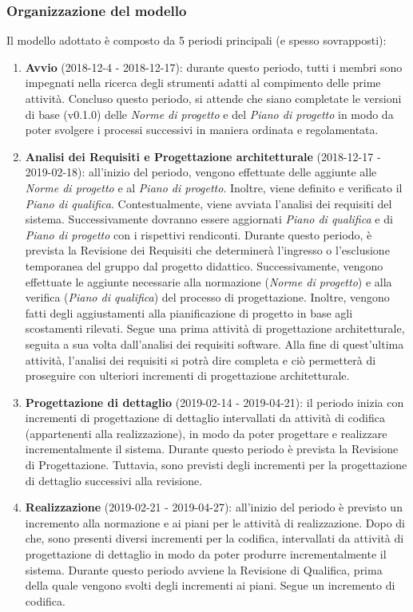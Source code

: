\subsubsection{Organizzazione del modello}
Il modello adottato è composto da 5 periodi principali (e spesso sovrapposti):
\begin{enumerate}
	\item \textbf{Avvio} (2018-12-4 - 2018-12-17): durante questo periodo, tutti i membri sono impegnati nella ricerca degli strumenti adatti al compimento delle prime attività. Concluso questo periodo, si attende che siano completate le versioni di base (v0.1.0) delle \textit{Norme di progetto} e del \emph{Piano di progetto} in modo da poter svolgere i processi successivi in maniera ordinata e regolamentata.
	\item \textbf{Analisi dei Requisiti e Progettazione architetturale} (2018-12-17 - 2019-02-18): all'inizio del periodo, vengono effettuate delle aggiunte alle \textit{Norme di progetto} e al \textit{Piano di progetto}. Inoltre, viene definito e verificato il \textit{Piano di qualifica}. Contestualmente, viene avviata l'analisi dei requisiti del sistema. Successivamente dovranno essere aggiornati \textit{Piano di qualifica} e di \textit{Piano di progetto} con i rispettivi rendiconti. Durante questo periodo, è prevista la Revisione dei Requisiti che determinerà l'ingresso o l'esclusione temporanea del gruppo dal progetto didattico. Successivamente, vengono effettuate le aggiunte necessarie alla normazione (\textit{Norme di progetto}) e alla verifica (\textit{Piano di qualifica}) del processo di progettazione. Inoltre, vengono fatti degli aggiustamenti alla pianificazione di progetto in base agli scostamenti rilevati. Segue una prima attività di progettazione architetturale, seguita a sua volta dall'analisi dei requisiti software. Alla fine di quest'ultima attività, l'analisi dei requisiti si potrà dire completa e ciò permetterà di proseguire con ulteriori incrementi di progettazione architetturale. 
\item \textbf{Progettazione di dettaglio} (2019-02-14 - 2019-04-21): il periodo inizia con incrementi di progettazione di dettaglio intervallati da attività di codifica (appartenenti alla realizzazione), in modo da poter progettare e realizzare incrementalmente il sistema. Durante questo periodo è prevista la Revisione di Progettazione. Tuttavia, sono previsti degli incrementi per la progettazione di dettaglio successivi alla revisione.
	\item \textbf{Realizzazione} (2019-02-21 - 2019-04-27): all'inizio del periodo è previsto un incremento alla normazione e ai piani per le attività di realizzazione. Dopo di che, sono presenti diversi incrementi per la codifica, intervallati da attività di progettazione di dettaglio in modo da poter produrre incrementalmente il sistema. Durante questo periodo avviene la Revisione di Qualifica, prima della quale vengono svolti degli incrementi ai piani. Segue un incremento di codifica.

\end{enumerate}
